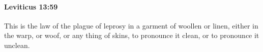 
		\paragraph{Leviticus 13:59} %
			\label{LEVITICUS-13-59}

			This is the law of the plague of leprosy in a garment of woollen or linen, either in the warp, or woof, or any thing of skins, to pronounce it clean, or to pronounce it unclean.


